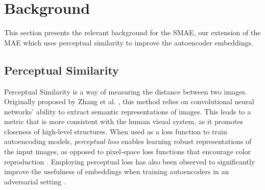 

\section{Background}
\label{sec:background}
This section presents the relevant background for the SMAE, our extension of the MAE which uses perceptual similarity to improve the autoencoder embeddings. 

\subsection{Perceptual Similarity}
\label{sec:percep}
Perceptual Similarity is a way of measuring the distance between two images. Originally proposed by Zhang et al. \cite{perceptual}, this method relies on convolutional neural networks' ability to extract semantic representations of images. This leads to a metric that is more consistent with the human visual system, as it promotes closeness of high-level structures. When used as a loss function to train autoencoding models, \textit{perceptual loss} enables learning robust representations of the input images, as opposed to pixel-space loss functions that encourage color reproduction \cite{perceptualautoencoder}. Employing perceptual loss has also been observed to significantly improve the usefulness of embeddings when training autoencoders in an adversarial setting \cite{ganautoencoder}.


